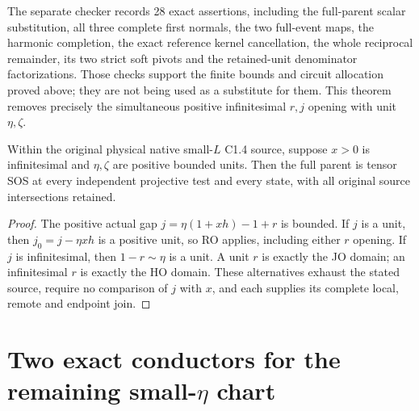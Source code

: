The separate checker records 28 exact assertions, including the
full-parent scalar substitution, all three complete first normals,
the two full-event maps, the harmonic completion, the exact reference
kernel cancellation, the whole reciprocal remainder, its two strict
soft pivots and the retained-unit denominator factorizations.
Those checks support the finite bounds and circuit allocation proved
above; they are not being used as a substitute for them.
This theorem removes precisely the simultaneous positive
infinitesimal $r,j$ opening with unit $\eta,\zeta$.

\begin{corollary}
Within the original physical native small-$L$ C1.4 source, suppose
$x>0$ is infinitesimal and $\eta,\zeta$ are positive bounded units.
Then the full parent is tensor SOS at every independent projective
test and every state, with all original source intersections retained.
\end{corollary}
\begin{proof}
The positive actual gap $j=\eta(1+xh)-1+r$ is bounded.
If $j$ is a unit, then $j_0=j-\eta xh$ is a positive unit,
so RO applies, including either $r$ opening. If $j$ is infinitesimal,
then $1-r\sim\eta$ is a unit. A unit $r$ is exactly the JO domain;
an infinitesimal $r$ is exactly the HO domain. These alternatives
exhaust the stated source, require no comparison of $j$ with $x$,
and each supplies its complete local, remote and endpoint join.
\end{proof}


\section{\texorpdfstring{Two exact conductors for the remaining small-$\eta$ chart}{Two exact conductors for the remaining small-eta chart}}
\label{component:peea9e9c546c5}

